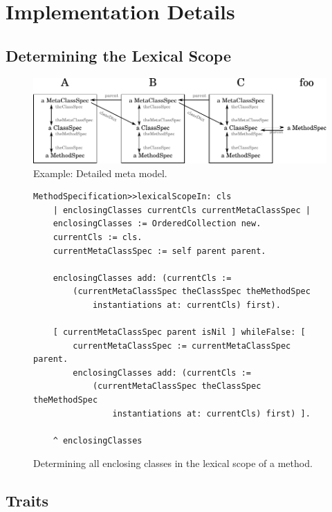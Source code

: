 
\chapter{Implementation Details}

\section{Determining the Lexical Scope}
\label{sec:app_lexical_scope}

\begin{figure}[!htp]
\includegraphics[width=\textwidth]{lexical_scope_app_ex.pdf}
\caption[Example: Detailed meta model]{Example: Detailed meta model.}
\end{figure}

\begin{figure}[!htp]
\begin{lstlisting}
MethodSpecification>>lexicalScopeIn: cls
    | enclosingClasses currentCls currentMetaClassSpec |
    enclosingClasses := OrderedCollection new.
    currentCls := cls.
    currentMetaClassSpec := self parent parent.

    enclosingClasses add: (currentCls := 
        (currentMetaClassSpec theClassSpec theMethodSpec 
            instantiations at: currentCls) first).

    [ currentMetaClassSpec parent isNil ] whileFalse: [
        currentMetaClassSpec := currentMetaClassSpec parent.
        enclosingClasses add: (currentCls := 
            (currentMetaClassSpec theClassSpec theMethodSpec 
                instantiations at: currentCls) first) ].

    ^ enclosingClasses
\end{lstlisting}
\caption[Determining the lexical scope of a method]{Determining all enclosing classes in the lexical scope of a method.}
\end{figure}

\section{Traits}
\label{sec:app_traits}

